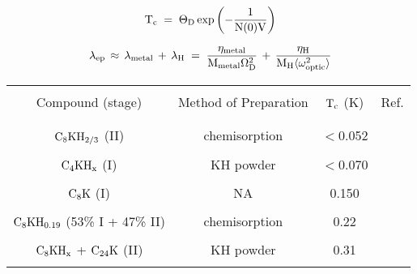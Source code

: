 {\newpage
\clearpage
\samepage \begin{displaymath}\rm T_c \; = \; \Theta_D \exp{\left(-\frac{1}{N(0)V}\right)}
\end{displaymath}
}

{\newpage
\clearpage
\samepage \begin{equation}\label{lambdacalc}
\rm \lambda_{ep} \, \approx \, \lambda_{metal} \, + \, \lambda_{H} \; = \; \frac{\eta_{metal}}{M_{metal} \Omega_D^2} \, + \, \frac{\eta_H}{M_{H} \langle \omega_{optic}^2 \rangle}
\end{equation}
}

{\newpage
\clearpage
\samepage \begin{table}\begin{center}

\vspace{0.5in}
\label{khtctable}
\begin{tabular}{|cccc|}
\hline
& & & \\ 
Compound (stage) & Method of Preparation & $\rm T_c$ (K) & Ref. \\ 
& & & \\ 
\hline
& & & \\ 
$\rm C_8KH_{2/3}$ (II)& chemisorption & $<$0.052 & \cite{sano80}\\ 
& & & \\ 
$\rm C_4KH_x$ (I)& KH powder & $<$0.070 & \cite{suzuki85b}\\ 
& & & \\ 
$\rm C_8K$ (I) & NA & 0.150 & \cite{koike80}\\ 
& & & \\ 
$\rm C_8KH_{0.19}$ (53\% I + 47\% II)& chemisorption& 0.22 & \cite{kaneiwa82}\\ 
& & & \\ 
$\rm C_8KH_x$ + $\rm C_{24}K$ (II)& KH powder & 0.31 & \cite{suzuki85b}\\ 
& & & \\ 
\hline
\end{tabular}
\end{center}
\end{table}
}

{\newpage
\clearpage
\samepage \begin{figure}\vspace{17cm}

\label{khC_v}
\end{figure}
}

